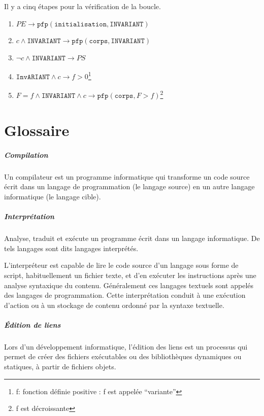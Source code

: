 \documentclass[12pt,a4paper,openany]{book}
\newcommand{\pfp}{\texttt{pfp}}
\begin{document}
Il y a cinq étapes pour la vérification de la boucle.
\begin{enumerate}
	\item $PE \rightarrow \pfp(\texttt{initialisation}, \texttt{INVARIANT})$
	\item $c \wedge \texttt{INVARIANT} \rightarrow \pfp (\texttt{corps}, \texttt{INVARIANT})$
	\item $\neg c \wedge \texttt{INVARIANT} \rightarrow PS$ 
	\item $ \texttt{InvARIANT} \wedge c \rightarrow f > 0$\footnote{f: fonction définie positive : f est appelée ``variante''}
	\item $F = f \wedge \texttt{INVARIANT} \wedge c \rightarrow \pfp (\texttt{corps}, F > f)$\footnote{f est décroissante}
\end{enumerate}

\appendix
	\chapter{Glossaire}
	\paragraph{Compilation} Un compilateur est un programme informatique qui transforme un code source écrit dans un langage de programmation (le langage source) en un autre langage informatique (le langage cible).
	\paragraph{Interprétation}
	Analyse, traduit et exécute un programme écrit dans un langage informatique. De tels langages sont dits langages interprétés.

	L'interpréteur est capable de lire le code source d'un langage sous forme de script, habituellement un fichier texte, et d'en exécuter les instructions après une analyse syntaxique du contenu. Généralement ces langages textuels sont appelés des langages de programmation. Cette interprétation conduit à une exécution d'action ou à un stockage de contenu ordonné par la syntaxe textuelle.  \paragraph{Édition de liens} Lors d’un développement informatique, l'édition des liens est un processus qui permet de créer des fichiers exécutables ou des bibliothèques dynamiques ou statiques, à partir de fichiers objets.
	
	\lstlistoflistings{}
\end{document}
